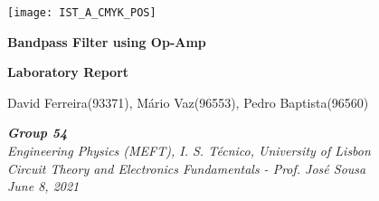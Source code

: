 
\thispagestyle {empty}

\texttt{[image: IST\_A\_CMYK\_POS]}

\begin{center}
%
\vspace{1.0cm}
\begin{center}\Large\textbf{Bandpass Filter using Op-Amp}\end{center}
\begin{center}\large\textbf{Laboratory Report}\end{center}

\begin{center} David Ferreira(93371), Mário Vaz(96553), Pedro Baptista(96560)\end{center}

\begin{center} \textit {\textbf{Group 54} \\Engineering Physics (MEFT), I. S. Técnico, University of Lisbon\\ Circuit Theory and Electronics Fundamentals - \small Prof. José Sousa\\June 8, 2021}\end{center}
%
\end{center}

